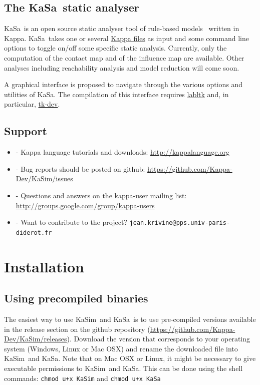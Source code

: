 \documentclass[11pt]{book}
\def\KaSim{\textsf{KaSim}}
\def\KaSa{\textsf{KaSa}}
\def\ttt#1{\texttt{#1}}
\def\ITE#1{\begin{itemize}#1\end{itemize}}
\begin{document}
\section{The \KaSa~static analyser}

\KaSa~is an open source static analyser  tool of rule-based models~\cite{DanLan04,Dan_etal07a,Fae_etal05} written in Kappa. \KaSa~takes one or several \hyperref[chap:kappa]{Kappa files} as input and some command line options to toggle on/off some specific static analysis. Currently, only the computation of the contact map and of the influence map are available. Other analyses including reachability analysis \cite{Feret-ICCMSE2007,DanosEtAl-VMCAI08} and model reduction \cite{Feret-et-al-pnas2009,DanosEtAl-LICS2010,Feret-MFPSXXVII} will come soon. 

A graphical interface is proposed to navigate through the various options and utilities  of \KaSa. The compilation of this interface requires \href{https://forge.ocamlcore.org/projects/labltk/}{labltk} and, in particular,  \href{http://www.tcl.tk/}{tk-dev}.


\section{Support}
\ITE{
\item[-] Kappa language tutorials and downloads: \url{http://kappalanguage.org}
\item[-] Bug reports should be posted on github: \url{https://github.com/Kappa-Dev/KaSim/issues}
\item[-] Questions and answers on the kappa-user mailing list: \url{http://groups.google.com/group/kappa-users}
\item[-] Want to contribute to the project? \ttt{jean.krivine@pps.univ-paris-diderot.fr}
}

\chapter{Installation}\label{chap:install}

\section{Using precompiled binaries}
The easiest way to use \KaSim~and \KaSa~is to use pre-compiled versions available in the release section on the github repository (\url{https://github.com/Kappa-Dev/KaSim/releases}). Download the version that corresponds to your operating system (Windows, Linux or Mac OSX) and rename the downloaded file into \KaSim~and \KaSa. Note that on Mac OSX or Linux, it might be necessary to give executable permissions to \KaSim~and \KaSa. This can be done using the shell commands:
\ttt{chmod u+x KaSim} and \ttt{chmod u+x KaSa}
\end{document}
